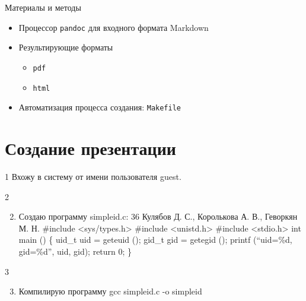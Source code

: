 \documentclass[
  ignorenonframetext,
  aspectratio=169,
]{beamer}
\providecommand{\tightlist}{%
  \setlength{\itemsep}{0pt}\setlength{\parskip}{0pt}}\usepackage{longtable,booktabs,array}
\begin{document}
\begin{frame}[fragile]{Материалы и методы}
\label{ux43cux430ux442ux435ux440ux438ux430ux43bux44b-ux438-ux43cux435ux442ux43eux434ux44b}
\begin{itemize}[<+->]
\tightlist
\item
  Процессор \texttt{pandoc} для входного формата Markdown
\item
  Результирующие форматы

  \begin{itemize}[<+->]
  \tightlist
  \item
    \texttt{pdf}
  \item
    \texttt{html}
  \end{itemize}
\item
  Автоматизация процесса создания: \texttt{Makefile}
\end{itemize}
\end{frame}

\section{Создание
презентации}\label{ux441ux43eux437ux434ux430ux43dux438ux435-ux43fux440ux435ux437ux435ux43dux442ux430ux446ux438ux438}

\begin{frame}{1}
\label{section}
Вхожу в систему от имени пользователя guest.
\end{frame}

\begin{frame}{2}
\label{section-1}
\begin{enumerate}[<+->]
\setcounter{enumi}{1}
\tightlist
\item
  Создаю программу simpleid.c: 36 Кулябов Д. С., Королькова А. В.,
  Геворкян М. Н. \#include \textless sys/types.h\textgreater{} \#include
  \textless unistd.h\textgreater{} \#include
  \textless stdio.h\textgreater{} int main () \{ uid\_t uid = geteuid
  (); gid\_t gid = getegid (); printf (\enquote{uid=\%d, gid=\%d\n},
  uid, gid); return 0; \}
\end{enumerate}
\end{frame}

\begin{frame}{3}
\label{section-2}
\begin{enumerate}[<+->]
\setcounter{enumi}{2}
\tightlist
\item
  Компилирую программу gcc simpleid.c -o simpleid
\end{enumerate}
\end{frame}
\end{document}
